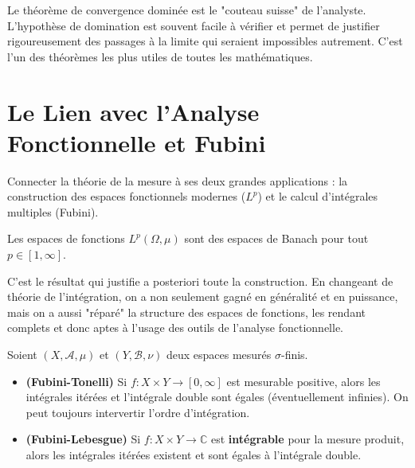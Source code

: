 \begin{remark}
    Le théorème de convergence dominée est le "couteau suisse" de l'analyste. L'hypothèse de domination est souvent facile à vérifier et permet de justifier rigoureusement des passages à la limite qui seraient impossibles autrement. C'est l'un des théorèmes les plus utiles de toutes les mathématiques.
\end{remark}

\section{Le Lien avec l'Analyse Fonctionnelle et Fubini}

\begin{objectif}
    Connecter la théorie de la mesure à ses deux grandes applications : la construction des espaces fonctionnels modernes ($L^p$) et le calcul d'intégrales multiples (Fubini).
\end{objectif}

\begin{theorem}
    Les espaces de fonctions $L^p(\Omega, \mu)$ sont des espaces de Banach pour tout $p \in [1, \infty]$.
\end{theorem}
\begin{remark}
    C'est le résultat qui justifie a posteriori toute la construction. En changeant de théorie de l'intégration, on a non seulement gagné en généralité et en puissance, mais on a aussi "réparé" la structure des espaces de fonctions, les rendant complets et donc aptes à l'usage des outils de l'analyse fonctionnelle.
\end{remark}

\begin{theorem}
    Soient $(X, \mathcal{A}, \mu)$ et $(Y, \mathcal{B}, \nu)$ deux espaces mesurés $\sigma$-finis.
    \begin{itemize}
        \item \textbf{(Fubini-Tonelli)} Si $f: X \times Y \to [0, \infty]$ est mesurable positive, alors les intégrales itérées et l'intégrale double sont égales (éventuellement infinies). On peut toujours intervertir l'ordre d'intégration.
        \item \textbf{(Fubini-Lebesgue)} Si $f: X \times Y \to \mathbb{C}$ est \textbf{intégrable} pour la mesure produit, alors les intégrales itérées existent et sont égales à l'intégrale double.
    \end{itemize}
\end{theorem}


